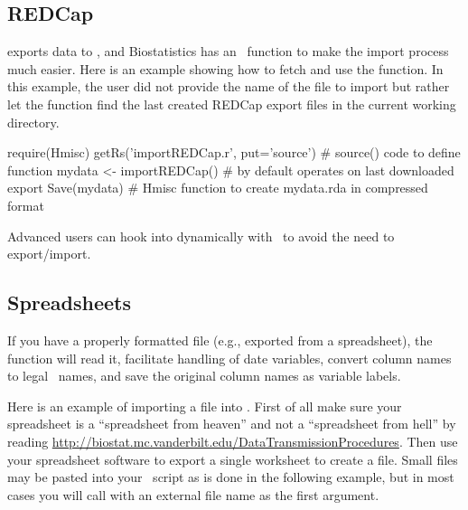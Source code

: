 \subsection{REDCap}
 exports data to \R, and Biostatistics has an \R\ function
to make the import process much easier.  Here is an example showing
how to fetch and use the function.  In this example, the user did not
provide the name of the file to import but rather let the function
find the last created REDCap export files in the current working directory.
\begin{Schunk}
\begin{Sinput}
require(Hmisc)
getRs('importREDCap.r', put='source')  # source() code to define function
mydata <- importREDCap()  # by default operates on last downloaded export
Save(mydata)   # Hmisc function to create mydata.rda in compressed format
\end{Sinput}
\end{Schunk}

Advanced users can hook into
 dynamically with \R\ to avoid the need to export/import.

\subsection{Spreadsheets}
If you have a properly
formatted  file (e.g., exported from a spreadsheet), the
  function will read it, facilitate handling
of date variables, convert column names to legal \R\ names, and
save the original column names as variable labels.

Here is an example of importing a  file into \R.  First of all
make sure your spreadsheet is a ``spreadsheet from heaven'' and not a
``spreadsheet from hell'' by reading
\url{http://biostat.mc.vanderbilt.edu/DataTransmissionProcedures}.
Then use your spreadsheet software to export a single worksheet to
create a  file.  Small  files may be pasted into your
\R\ script as is done in the following example, but in most cases you
will call  with an external file name as the first
argument.

